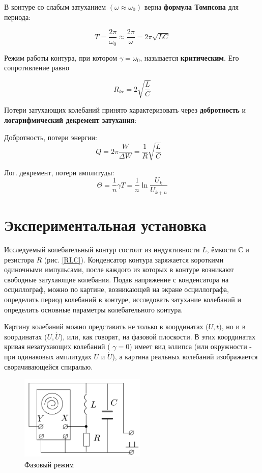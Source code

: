 В контуре со слабым затуханием $ (\omega \approx \omega_0) $ верна \textbf{формула Томпсона} для периода: 

\begin{equation}\label{}
T = \frac{2\pi}{\omega_0} \approx \frac{2\pi}{\omega} = 2\pi\sqrt{LC}
\end{equation}

Режим работы контура, при котором $ \gamma = \omega_0 $, называется \textbf{критическим}. Его сопротивление равно 

\begin{equation}\label{}
R_{kr} = 2\sqrt{\frac{L}{C}}
\end{equation}

Потери затухающих колебаний принято характеризовать через \textbf{добротность} и \textbf{логарифмический декремент затухания}: 

Добротность, потери энергии:
\begin{equation}\label{Q}
Q = 2\pi \frac{W}{\Delta W} = \frac{1}{R} \sqrt{\frac{L}{C}} \quad 
\end{equation}

Лог. декремент, потери амплитуды:
\begin{equation}\label{theta}
\Theta = \frac{1}{n} \gamma T = \frac{1}{n} \ln \frac{U_k}{U_{k+n}}
\end{equation}

\section{Экспериментальная установка}

Исследуемый колебательный контур состоит из индуктивности $ L $,
ёмкости $ С $ и резистора $ R $ (рис. \ref{RLC}). Конденсатор контура заряжается
короткими одиночными импульсами, после каждого из которых в контуре
возникают свободные затухающие колебания. Подав напряжение
с конденсатора на осциллограф, можно по картине, возникающей на
экране осциллографа, определить период колебаний в контуре, исследовать
затухание колебаний и определить основные параметры колебательного
контура.

Картину колебаний можно представить не только в координатах ($ U, t $), но и в координатах ($ U, \dot{U} $), или, как говорят, на фазовой
плоскости. В этих координатах кривая незатухающих колебаний ( $ \gamma = 0 $)
имеет вид эллипса (или окружности - при одинаковых амплитудах $ U $
и $ \dot{U} $), а картина реальных колебаний изображается сворачивающейся
спиралью. 


\begin{figure}[h]
	\includegraphics[width=6cm]{pics/Fase.png}
	\caption{Фазовый режим}
	\label{Fase}
\end{figure}

